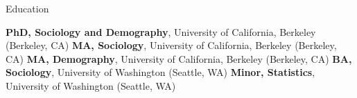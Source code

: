 \begin{rubric}{Education}

\entry*[2004] \textbf{PhD, Sociology and Demography}, University of California, Berkeley (Berkeley, CA) 
\entry*[2001] \textbf{MA, Sociology}, University of California, Berkeley (Berkeley, CA) 
\entry*[1999] \textbf{MA, Demography}, University of California, Berkeley (Berkeley, CA) 
\entry*[1998] \textbf{BA, Sociology}, University of Washington (Seattle, WA) 
\entry*[1998] \textbf{Minor, Statistics}, University of Washington (Seattle, WA) 

\end{rubric}